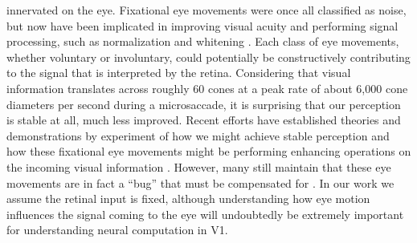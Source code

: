 innervated on the eye. Fixational eye movements were once all classified as noise, but now have been implicated in improving visual acuity \parencite{ratnam2017benefits, rucci2007miniature} and performing signal processing, such as normalization and whitening \parencite{aytekin2014visual}. Each class of eye movements, whether voluntary or involuntary, could potentially be constructively contributing to the signal that is interpreted by the retina. Considering that visual information translates across roughly 60 cones at a peak rate of about 6,000 cone diameters per second during a microsaccade, it is surprising that our perception is stable at all, much less improved. Recent efforts have established theories and demonstrations by experiment of how we might achieve stable perception \parencite{arathorn2013unstable, bridgeman2010brain, murakami1998jitter, burak2010bayesian} and how these fixational eye movements might be performing enhancing operations on the incoming visual information \parencite{ahissar2012seeing, mostofi2016visual, kenyon2004correlated}. However, many still maintain that these eye movements are in fact a ``bug'' that must be compensated for \parencite{packer1992blurring, kowler1979miniature, engbert2011integrated}. In our work we assume the retinal input is fixed, although understanding how eye motion influences the signal coming to the eye will undoubtedly be extremely important for understanding neural computation in V1.


